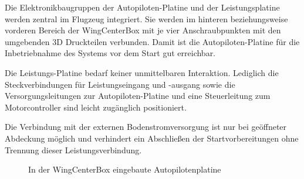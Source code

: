 Die Elektronikbaugruppen der Autopiloten-Platine und der Leistungsplatine werden zentral im Flugzeug integriert. Sie werden im hinteren beziehungsweise vorderen Bereich der WingCenterBox mit je vier Anschraubpunkten mit den umgebenden 3D Druckteilen verbunden.
Damit ist die Autopiloten-Platine für die Inbetriebnahme des Systems vor dem Start gut erreichbar.

Die Leistungs-Platine bedarf keiner unmittelbaren Interaktion. Lediglich die Steckverbindungen für Leistungseingang  und -ausgang sowie die Versorgungsleitungen zur Autopiloten-Platine und eine Steuerleitung zum Motorcontroller sind leicht zugänglich positioniert.

Die Verbindung mit der externen Bodenstromversorgung ist nur bei geöffneter Abdeckung möglich und verhindert ein Abschließen der Startvorbereitungen ohne Trennung dieser Leistungsverbindung.

\begin{figure}[H]
\centering
{}
\caption{In der WingCenterBox eingebaute Autopilotenplatine} 
\label{fig:In der WingCenterBox eingebaute Autopilotenplatine}
\end{figure}